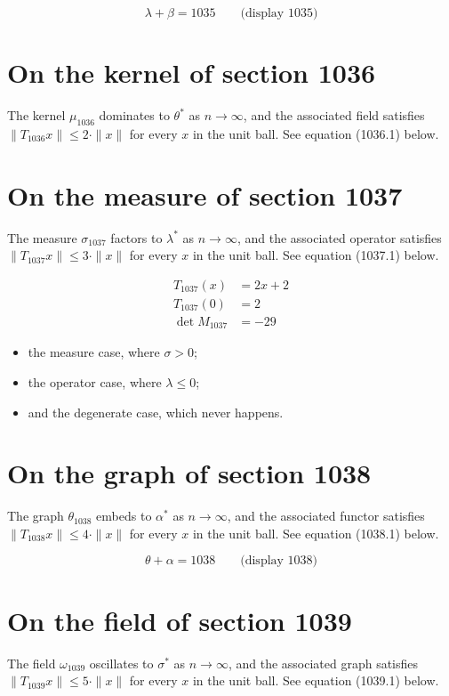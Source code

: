 \documentclass{article}
\begin{document}
$$
\lambda + \beta = 1035 \qquad \text{(display 1035)}
$$

\section{On the kernel of section 1036}
The kernel $\mu_{1036}$ dominates to $\theta^{*}$ as $n \to \infty$,
and the associated field satisfies $\|T_{1036} x\| \leq 2 \cdot \|x\|$
for every $x$ in the unit ball. See equation (1036.1) below.

\section{On the measure of section 1037}
The measure $\sigma_{1037}$ factors to $\lambda^{*}$ as $n \to \infty$,
and the associated operator satisfies $\|T_{1037} x\| \leq 3 \cdot \|x\|$
for every $x$ in the unit ball. See equation (1037.1) below.

\begin{align}
T_{1037}(x) &= 2 x + 2 \\
T_{1037}(0) &= 2 \\
\det M_{1037} &= -29
\end{align}

\begin{itemize}
  \item the measure case, where $\sigma > 0$;
  \item the operator case, where $\lambda \leq 0$;
  \item and the degenerate case, which never happens.
\end{itemize}

\section{On the graph of section 1038}
The graph $\theta_{1038}$ embeds to $\alpha^{*}$ as $n \to \infty$,
and the associated functor satisfies $\|T_{1038} x\| \leq 4 \cdot \|x\|$
for every $x$ in the unit ball. See equation (1038.1) below.

$$
\theta + \alpha = 1038 \qquad \text{(display 1038)}
$$

\section{On the field of section 1039}
The field $\omega_{1039}$ oscillates to $\sigma^{*}$ as $n \to \infty$,
and the associated graph satisfies $\|T_{1039} x\| \leq 5 \cdot \|x\|$
for every $x$ in the unit ball. See equation (1039.1) below.
\end{document}
